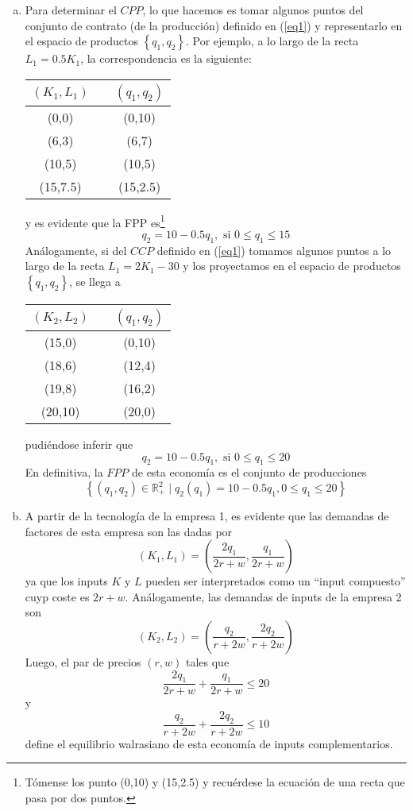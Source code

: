 \begin{enumerate}[a)]
	\item Para determinar el $CPP$, lo que hacemos es tomar algunos puntos del conjunto de contrato (de la producción) definido en (\ref{eq1}) y representarlo en el espacio de productos $\left\lbrace q_1,q_2\right\rbrace$. Por ejemplo, a lo largo de la recta $L_1 = 0.5 K_1$, la correspondencia es la siguiente:
		\begin{center}
			\begin{tabular}{ccc}
				\hline
					$\left( K_1, L_1\right)$ & {} & $\left( q_1, q_2\right)$ \\
				\hline
					(0,0) 	 & {} & (0,10)	\\
					(6,3) 	 & {} & (6,7)	\\
					(10,5)   & {} & (10,5)	\\
					(15,7.5) & {} & (15,2.5) \\
				\hline
			\end{tabular}
		\end{center}
	y es evidente que la FPP es\footnote{Tómense los punto (0,10) y (15,2.5) y recuérdese la ecuación de una recta que pasa por dos puntos.}
			$$q_2 = 10 - 0.5q_1, \text{ si } 0 \leq q_1 \leq 15$$
	Análogamente, si del $CCP$ definido en (\ref{eq1}) tomamos algunos puntos a lo largo de la recta $L_1 = 2K_1 - 30$ y los proyectamos en el espacio de productos $\left\lbrace q_1,q_2\right\rbrace $, se llega a
		\begin{center}
			\begin{tabular}{ccc}
				\hline
					$\left( K_2, L_2\right)$ & {} & $\left( q_1, q_2\right)$ \\
				\hline
					(15,0) 	 & {} & (0,10)	\\
					(18,6) 	 & {} & (12,4)	\\
					(19,8)   & {} & (16,2)	\\
					(20,10)  & {} & (20,0)  \\
				\hline
			\end{tabular}
		\end{center}
	pudiéndose inferir que
			$$q_2 = 10 - 0.5q_1, \text{ si } 0 \leq q_1 \leq 20$$
	En definitiva, la $FPP$ de esta economía es el conjunto de producciones
			$$\left\lbrace \left(q_1, q_2 \right) \in \mathbb{R}_{+}^{2} \mid q_2 \left( q_1\right) = 10 -0.5q_1, 0 \leq q_1 \leq 20 \right\rbrace $$
	\item A partir de la tecnología de la empresa 1, es evidente que las demandas de factores de esta empresa son las dadas por
			$$\left( K_1, L_1\right) = \left( \frac{2q_1}{2r + w}, \frac{q_1}{2r + w}\right) $$
	ya que los inputs $K$ y $L$ pueden ser interpretados como un ``input compuesto'' cuyp coste es $2r+w$. Análogamente, las demandas de inputs de la empresa 2 son
			$$\left( K_2, L_2\right) = \left( \frac{q_2}{r + 2w}, \frac{2q_2}{r + 2w}\right) $$
	Luego, el par de precios $(r, w)$ tales que
			$$\frac{2q_1}{2r + w}+  \frac{q_1}{2r + w} \leq 20$$
	y
			$$\frac{q_2}{r + 2w} + \frac{2q_2}{r + 2w} \leq 10$$
	define el equilibrio walrasiano de esta economía de inputs complementarios.
\end{enumerate}